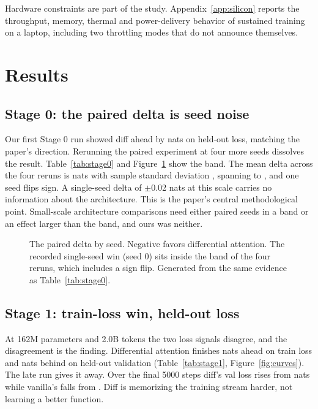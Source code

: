 Hardware constraints are part of the study. Appendix~\ref{app:silicon}
reports the throughput, memory, thermal and power-delivery behavior of
sustained training on a laptop, including two throttling modes that do
not announce themselves.

\section{Results}

\subsection{Stage 0: the paired delta is seed noise}
\label{sec:stage0}
Our first Stage 0 run showed diff ahead by \StageZeroRecordedDelta{}
nats on held-out loss, matching the paper's direction. Rerunning the
paired experiment at four more seeds dissolves the result.
Table~\ref{tab:stage0} and Figure~\ref{fig:band} show the band. The
mean delta across the four reruns is \StageZeroMeanDelta{} nats with
sample standard deviation \StageZeroStdDelta{}, spanning
\StageZeroMinDelta{} to \StageZeroMaxDelta{}, and one seed flips sign.
A single-seed delta of $\pm$0.02 nats at this scale carries no
information about the architecture. This is the paper's central
methodological point. Small-scale architecture comparisons need either
paired seeds in a band or an effect larger than the band, and ours was
neither.

\begin{table}[tbp]
\centering

\caption{Stage 0 (30M params, 100M tokens) paired val loss by seed.
Seed 0 is the original run on the first data build, recorded before the
band was run. Seeds 1 to 4 rerun the full paired experiment on a
rebuilt tokenization of the same corpus. Generated from committed run
logs.}
\label{tab:stage0}
\end{table}

\begin{figure}[tbp]
\centering

\caption{The paired delta by seed. Negative favors differential
attention. The recorded single-seed win (seed 0) sits inside the band
of the four reruns, which includes a sign flip. Generated from the same
evidence as Table~\ref{tab:stage0}.}
\label{fig:band}
\end{figure}

\subsection{Stage 1: train-loss win, held-out loss}
At 162M parameters and 2.0B tokens the two loss signals disagree, and
the disagreement is the finding. Differential attention finishes
\StageOneTrainDeltaSigned{} nats ahead on train loss and
\StageOneValDeltaSigned{} nats behind on held-out validation
(Table~\ref{tab:stage1}, Figure~\ref{fig:curves}). The late run gives
it away. Over the final 5000 steps diff's val loss rises from
\StageOneDiffValLateRise{} nats while vanilla's falls from
\StageOneVanillaValLateFall{}. Diff is memorizing the training stream
harder, not learning a better function.

